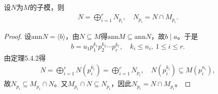 \documentclass[../../main.tex]{subfiles}%
\begin{document}
\begin{corollary}
设$N$为$M$的子模，则
\begin{align*}
N=\bigoplus\limits_{i=1}^{r}N_{p_i},\quad N_{p_i}=N\cap M_{p_i}.
\end{align*}
\end{corollary}
\begin{proof}

设$\mathrm{ann}N=\langle b\rangle$，由$N\subseteq M$得$\mathrm{ann}M\subseteq\mathrm{ann}N$，故$b\mid a$。于是
\begin{align*}
b=u_1p_1^{k_1}p_2^{k_2}\cdots p_r^{k_r},\quad k_i\leqslant n_i,\ 1\leqslant i\leqslant r.
\end{align*}
由定理5.4.2得
\begin{align*}
N=\bigoplus\limits_{i=1}^{r}N(p_i^{k_i})=\bigoplus\limits_{i=1}^{r}N_{p_i},\quad N(p_i^{k_i})\subseteq M(p_i^{n_i}),
\end{align*}
故$N_{p_i}\subseteq M_{p_i}\cap N$。又$M_{p_i}\cap N\subseteq N_{p_i}$，因此$N_{p_i}=N\cap M_{p_i}$。

\end{proof}
\end{document}
